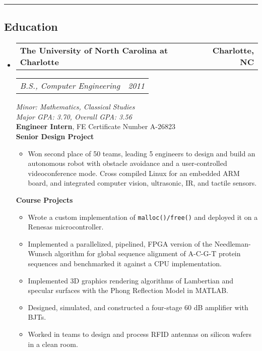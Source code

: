 \documentclass[10pt,letterpaper]{article}
\newcommand{\headerrow}[2]{%
    \begin{tabularx}{\linewidth}{Xr}
	    #1 & #2 \\
    \end{tabularx}
}
\begin{document}
\vspace{2pt}
\hrule
\vspace{-0.4em}
\subsection*{Education}
\begin{itemize}
	\parskip=0.1em
	\item
	\headerrow{\textbf{The University of North Carolina at Charlotte}}
		{\textbf{Charlotte, NC}}
	\headerrow{\textit{B.S., Computer Engineering}}{\textit{2011}}
		\textit{Minor: Mathematics, Classical Studies} \\
        \textit{Major GPA\@: 3.70, Overall GPA\@: 3.56} \\
        \textbf{Engineer Intern},  FE Certificate Number A-26823 \\
        \textbf{Senior Design Project}
        \begin{itemize}
            \item Won second place of 50 teams, leading 5 engineers to design
                and build an autonomous robot with obstacle avoidance and a
                user-controlled videoconference mode.  Cross compiled Linux for
                an embedded ARM board, and integrated computer vision,
                ultrasonic, IR, and tactile sensors.
        \end{itemize}
    \textbf{Course Projects}
    \begin{itemize}
        \item Wrote a custom implementation of \texttt{malloc()/free()} %
            and deployed it on a Renesas microcontroller.

        \item Implemented a parallelized, pipelined, FPGA version of the
            Needleman-Wunsch algorithm for global sequence alignment of A-C-G-T
            protein sequences and benchmarked it against a CPU implementation.

        \item Implemented 3D graphics rendering algorithms of Lambertian and
            specular surfaces with the Phong Reflection Model in MATLAB\@.

        \item Designed, simulated, and constructed a four-stage 60 dB amplifier
            with BJTs.

        \item Worked in teams to design and process RFID antennas on silicon
            wafers in a clean room.
    \end{itemize}
\end{itemize}
\end{document}
